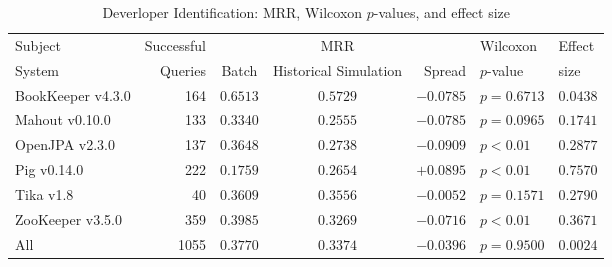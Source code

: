 \begin{table}[t]
\centering
\caption{Deverloper Identification: MRR, Wilcoxon $p$-values, and effect size}
\begin{tabular}{l|r|ccr|ll}
\toprule
Subject & Successful &    & MRR &        & Wilcoxon  & Effect \\
System  & Queries    & Batch & Historical Simulation  & Spread & $p$-value & size \\
\midrule
BookKeeper v4.3.0 & 164 & $\bm{0.6513}$ & $0.5729$ & $-0.0785$ & $p = 0.6713$ & $0.0438$ \\
Mahout v0.10.0 & 133 & $\bm{0.3340}$ & $0.2555$ & $-0.0785$ & $p = 0.0965$ & $0.1741$ \\
OpenJPA v2.3.0 & 137 & $\bm{0.3648}$ & $0.2738$ & $-0.0909$ & $p < 0.01$ & $0.2877$ \\
Pig v0.14.0 & 222 & $0.1759$ & $\bm{0.2654}$ & $+0.0895$ & $p < 0.01$ & $0.7570$ \\
Tika v1.8 & 40 & $\bm{0.3609}$ & $0.3556$ & $-0.0052$ & $p = 0.1571$ & $0.2790$ \\
ZooKeeper v3.5.0 & 359 & $\bm{0.3985}$ & $0.3269$ & $-0.0716$ & $p < 0.01$ & $0.3671$ \\
\midrule
All & 1055 & $\bm{0.3770}$ & $0.3374$ & $-0.0396$ & $p = 0.9500$ & $0.0024$ \\
\bottomrule
\end{tabular}
\label{table:triage_rq2}
\end{table}
